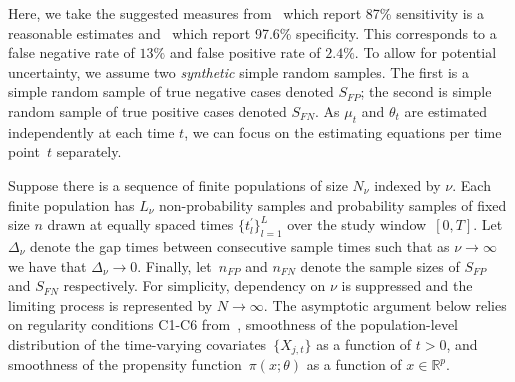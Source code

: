 \documentclass[12pt]{amsart}
\numberwithin{equation}{section}
\theoremstyle{plain}
\begin{document}

Here, we take the suggested measures from~\cite{Arevalo2020} which report 87\% sensitivity is a reasonable estimates and~\cite{Cohen2020} which report 97.6\% specificity.  This corresponds to a false negative rate of $13\%$ and false positive rate of $2.4\%$.  To allow for potential uncertainty, we assume two \emph{synthetic} simple random samples.  The first is a simple random sample of true negative cases denoted $S_{FP}$; the second is simple random sample of true positive cases denoted $S_{FN}$.  As $\mu_t$ and $\theta_{t}$ are estimated independently at each time $t$, we can focus on the estimating equations per time point~$t$ separately.

Suppose there is a sequence of finite populations of size $N_{\nu}$ indexed by $\nu$.  Each finite population has $L_\nu$ non-probability samples and  probability samples of fixed size $n$ drawn at equally spaced times $\{ t^\prime_l \}_{l=1}^L$ over the study window~$[0,T]$. Let~$\Delta_\nu$ denote the gap times between consecutive sample times such that as $\nu \to \infty$ we have that $\Delta_\nu \to 0$. Finally, let~$n_{FP}$ and $n_{FN}$ denote the sample sizes of $S_{FP}$ and $S_{FN}$ respectively.  For simplicity, dependency on $\nu$ is suppressed and the limiting process is represented by $N \to \infty$. The asymptotic argument below relies on regularity conditions C1-C6 from~\cite{Chen2019}, smoothness of the population-level distribution of the time-varying covariates~$\{ X_{j,t} \}$ as a function of $t > 0$, and smoothness of the propensity function~$\pi(x; \theta)$ as a function of $x \in \mathbb{R}^p$.
\end{document}
